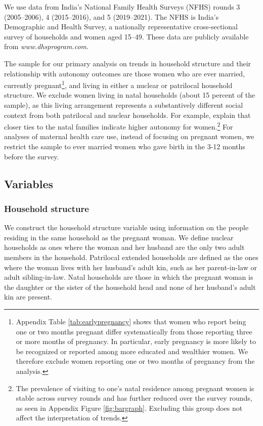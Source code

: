 \documentclass[12pt]{article}
\begin{document}
We use data from India’s National Family Health Surveys (NFHS) rounds 3 (2005–2006), 4 (2015–2016), and 5 (2019–2021). The NFHS is India’s Demographic and Health Survey, a nationally representative cross-sectional survey of households and women aged 15–49. These data are publicly available from \textit{www.dhsprogram.com}.

The sample for our primary analysis on trends in household structure and their relationship with autonomy outcomes are those women who are ever married, currently pregnant\footnote{Appendix Table \ref{tab:earlypregnancy} shows that women who report being one or two months pregnant differ systematically from those reporting three or more months of pregnancy. In particular, early pregnancy is more likely to be recognized or reported among more educated and wealthier women. We therefore exclude women reporting one or two months of pregnancy from the analysis.}, and living in either a nuclear or patrilocal household structure. We exclude women living in natal households (about 15 percent of the sample), as this living arrangement represents a substantively different social context from both patrilocal and nuclear households. For example, \cite{dyson1983kinship} explain that closer ties to the natal families indicate higher autonomy for women.\footnote{The prevalence of visiting to one's natal residence among pregnant women is stable across survey rounds and has further reduced over the survey rounds, as seen in Appendix Figure \ref{fig:bargraph}.  Excluding this group does not affect the interpretation of trends.} For analyses of maternal health care use, instead of focusing on pregnant women, we restrict the sample to ever married women who gave birth in the 3-12 months before the survey.

\subsection{Variables}

\subsubsection{Household structure}
We construct the household structure variable using information on the people residing in the same household as the pregnant woman. We define nuclear households as ones where the woman and her husband are the only two adult members in the household. Patrilocal extended households are defined as the ones where the woman lives with her husband’s adult kin, such as her parent-in-law or adult sibling-in-law. Natal households are those in which the pregnant woman is the daughter or the sister of the household head and none of her husband’s adult kin are present. 
\end{document}

